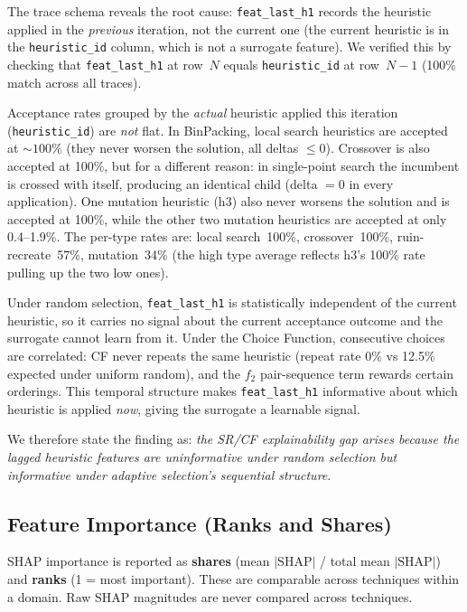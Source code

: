 \documentclass[11pt,a4paper]{article}
\begin{document}
The trace schema reveals the root cause: \texttt{feat\_last\_h1} records the
heuristic applied in the \emph{previous} iteration, not the current one (the
current heuristic is in the \texttt{heuristic\_id} column, which is not a
surrogate feature). We verified this by checking that
\texttt{feat\_last\_h1} at row~$N$ equals \texttt{heuristic\_id} at
row~$N{-}1$ (100\% match across all traces).

Acceptance rates grouped by the \emph{actual} heuristic applied this iteration
(\texttt{heuristic\_id}) are \emph{not} flat. In BinPacking, local search
heuristics are accepted at ${\sim}100\%$ (they never worsen the solution,
all deltas $\leq 0$). Crossover is also accepted at 100\%, but for a
different reason: in single-point search the incumbent is crossed with
itself, producing an identical child (delta $= 0$ in every application).
One mutation heuristic (h3) also never worsens the solution and is
accepted at 100\%, while the other two mutation heuristics are accepted
at only 0.4--1.9\%. The per-type rates are: local search~100\%,
crossover~100\%, ruin-recreate~57\%, mutation~34\% (the high type
average reflects h3's 100\% rate pulling up the two low ones).

Under random selection, \texttt{feat\_last\_h1} is statistically independent
of the current heuristic, so it carries no signal about the current
acceptance outcome and the surrogate cannot learn from it. Under the
Choice Function, consecutive choices are correlated: CF never repeats
the same heuristic (repeat rate 0\% vs 12.5\% expected under uniform
random), and the $f_2$ pair-sequence term rewards certain orderings.
This temporal structure makes \texttt{feat\_last\_h1} informative about
which heuristic is applied \emph{now}, giving the surrogate a learnable
signal.

We therefore state the finding as: \emph{the SR/CF explainability gap
arises because the lagged heuristic features are uninformative under
random selection but informative under adaptive selection's sequential
structure}.

\subsection{Feature Importance (Ranks and Shares)}

SHAP importance is reported as \textbf{shares} (mean $|\mathrm{SHAP}|$ / total mean
$|\mathrm{SHAP}|$) and \textbf{ranks} (1 = most important). These are comparable
across techniques within a domain. Raw SHAP magnitudes are never compared across
techniques.
\end{document}
